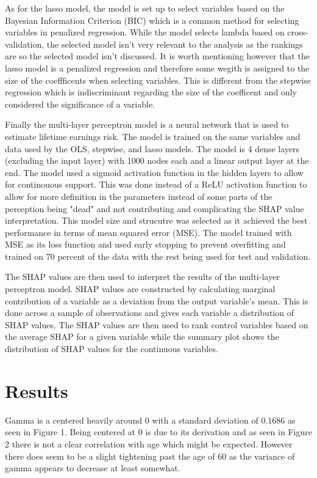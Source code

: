 \documentclass[12pt]{article}
\begin{document}
\begin{onehalfspace}
As for the lasso model, the model is set up to select variables based on the Bayesian Information Criterion (BIC) which is a common method for selecting variables in penalized regression. While the model selects lambda based on cross-validation, the selected model isn't very relevant to the analysis as the rankings are so the selected model isn't discussed. It is worth mentioning however that the lasso model is a penalized regression and therefore some wegith is assigned to the size of the coeffficents when selecting variables. This is different from the stepwise regression which is indiscriminant regarding the size of the coefficent and only considered the significance of a variable.

Finally the multi-layer perceptron model is a neural network that is used to estimate lifetime earnings risk. The model is trained on the same variables and data used by the OLS, stepwise, and lasso models. The model is 4 dense layers (excluding the input layer) with 1000 nodes each and a linear output layer at the end. The model used a sigmoid activation function in the hidden layers to allow for continouous support. This was done instead of a ReLU activation function to allow for more definition in the parameters instead of some parts of the perception being "dead" and not contributing and complicating the SHAP value interpretation. This model size and strucutre was selected as it achieved the best performance in terms of mean squared error (MSE). The model trained with MSE as its loss function and used early stopping to prevent overfitting and trained on 70 percent of the data with the rest being used for test and validation.

The SHAP values are then used to interpret the results of the multi-layer perceptron model. SHAP values are constructed by calculating marginal contribution of a variable as a deviation from the output variable's mean. This is done across a sample of observations and gives each variable a distribution of SHAP values. The SHAP values are then used to rank control variables based on the average SHAP for a given variable while the summary plot shows the distribution of SHAP values for the continuous variables. 



\section{Results}



Gamma is a centered heavily around 0 with a standard deviation of 0.1686 as seen in Figure 1. Being centered at 0 is due to its derivation and as seen in Figure 2 there is not a clear correlation with age which might be expected. However there does seem to be a slight tightening past the age of 60 as the variance of gamma appears to decrease at least somewhat.


\end{onehalfspace}
\end{document}
